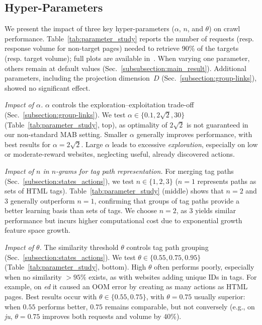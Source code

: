 \subsection{Hyper-Parameters}\label{subsubsection:metaparameters_result}

We present the impact of three key hyper-parameters ($\alpha$, $n$, and $\theta$) on crawl performance. Table~\ref{tab:parameter_study} reports the number of requests (resp. response volume for non-target pages) needed to retrieve 90\% of the targets (resp. target volume);
full plots are available in~\cite{github_repository}. When varying one parameter, others remain at default values (Sec.~\ref{subsubsection:main_result}). Additional parameters, including the projection dimension~$D$ (Sec.~\ref{subsection:group-links}), showed no significant effect.

\begin{inparaenum}
	\item \emph{Impact of $\alpha$.} $\alpha$ controls the exploration--exploitation trade-off (Sec.~\ref{subsection:group-links}). We test $\alpha \in \{0.1,2\sqrt{2},30\}$ (Table~\ref{tab:parameter_study}, top), as optimality of $2\sqrt{2}$ is not guaranteed in our non-standard MAB setting. Smaller $\alpha$ generally improves performance, with best results for $\alpha=2\sqrt{2}$. Large $\alpha$ leads to excessive \emph{exploration}, especially on low or moderate-reward websites, neglecting useful, already discovered actions.
	\item \emph{Impact of $n$ in $n$-grams for tag path representation.} For merging tag paths (Sec.~\ref{subsection:states_actions}), we test $n \in \{1,2,3\}$ ($n=1$ represents paths as sets of HTML tags). Table~\ref{tab:parameter_study} (middle) shows that $n=2$ and $3$ generally outperform $n=1$, confirming that groups of tag paths provide a better learning basis than sets of tags. We choose $n=2$, as $3$ yields similar performance but incurs higher computational cost due to exponential growth feature space growth.
	\item \emph{Impact of $\theta$.} The similarity threshold $\theta$ controls tag path grouping (Sec.~\ref{subsection:states_actions}). We test $\theta \in \{0.55,0.75,0.95\}$ (Table~\ref{tab:parameter_study}, bottom). High $\theta$ often performs poorly, especially when no similarity $>95\%$ exists, as with websites adding unique IDs in tags. For example, on \emph{ed} it caused an OOM error by creating as many actions as HTML pages. Best results occur with $\theta \in \{0.55,0.75\}$, with $\theta=0.75$ usually superior: when $0.55$ performs better, $0.75$ remains comparable, but not conversely (e.g., on \emph{ju}, $\theta=0.75$ improves both requests and volume by 40\%).

\end{inparaenum}

